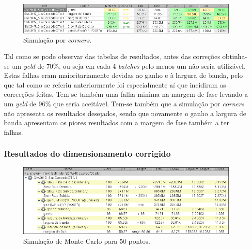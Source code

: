 \documentclass[11pt]{article}
\numberwithin{equation}{section}
\begin{document}
\begin{figure}[H]
	\centering
	\includegraphics[keepaspectratio=true, scale=0.65]{exps/Corners_Antigo}
	\vspace{-0.5em}
	\caption{Simulação por \textit{corners}.}
	\vspace{-0.8em}
\end{figure} 

Tal como se pode observar das tabelas de resultados, antes das correções obtinha-se um \textit{yeld} de 70\%, ou seja em cada 4 \textit{batches} pelo menos um não seria utilizável. Estas falhas eram maioritariamente devidas ao ganho e à largura de banda, pelo que tal como se referiu anteriormente foi especialmente aí que incidiram as correcções feitas. Tem-se também uma falha minima na margem de fase levando a um \textit{yeld} de 96\% que seria aceitável. Tem-se também que a simulação por \textit{corners} não apresenta os resultados desejados, sendo que novamente o ganho a largura de banda apresentam os piores resultados com a margem de fase também a ter falhas.

\subsubsection{Resultados do dimensionamento corrigido} 

\begin{figure}[H]
	\centering
	\includegraphics[keepaspectratio=true, scale=0.65]{exps/MonteCarlo_50pt_Novo}
	\vspace{-0.5em}
	\caption{Simulação de Monte Carlo para 50 pontos.}
	\vspace{-0.8em}
\end{figure} 
\end{document}

